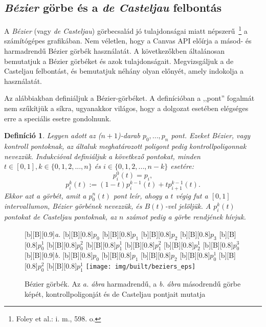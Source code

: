 \documentclass[12pt]{report}
\newtheorem{defi}[tét]{Definíció}
\theoremstyle{definition}
\begin{document}
    \subsection*{\emph{Bézier} görbe és a \emph{de Casteljau} felbontás}
    \label{sec:Bézier görbe és a de Casteljau felbontás}

A \emph{Bézier} (vagy \emph{de Casteljau}) görbecsalád jó tulajdonságai miatt
népszerű~\footnote{Foley et al.: i. m., 598. o.} a számítógépes grafikában. Nem
véletlen, hogy a Canvas API előírja a másod- és harmadrendű Bézier görbék
használatát. A következőkben általánosan bemutatjuk a Bézier görbéket és azok
tulajdonságait. Megvizsgáljuk a de Casteljau felbontást, és bemutatjuk néhány
olyan előnyét, amely indokolja a használatát.

Az alábbiakban definiáljuk a Bézier-görbéket. A definícióban a ,,pont'' fogalmát
nem szűkítjük a síkra, ugyanakkor világos, hogy a dolgozat esetében elégséges
erre a speciális esetre gondolnunk.

\begin{defi}\label{def:Bézier}\cite[Kurusa]{Kurusa:1999:szamitogepes} Legyen
adott az ($n+1$)-darab $p_0,...,p_n$ pont. Ezeket Bézier, vagy kontroll
pontoknak, az általuk meghatározott poligont pedig kontrollpoligonnak nevezzük.
Indukcióval definiáljuk a következő pontokat, minden $t \in [0,1], k \in
\{{0,1,2,...,n\}}$ és $i \in \{{0,1,2,...,n-k\}}$ esetére: \[p^0_i(t)=p_i,\]
\[p^k_i(t):=(1-t)p^{k-1}_i(t) + tp^{k-1}_{i+1}(t).\] Ekkor azt a görbét, amit a
$p^n_0(t)$ pont leír, ahogy a $t$ végig fut a $[0,1]$ intervallumon, Bézier
görbének nevezzük, és $B(t)$-vel jelöljük. A $p^k_i(t)$ pontokat de Casteljau
pontoknak, az $n$ számot pedig a görbe rendjének hívjuk. \end{defi}

  \begin{figure}
  [b][B][0.9]{\emph{a.}}
  [b][B][0.8]{\bf{$p_{0}$}}
  [b][B][0.8]{\bf{$p_{1}$}}
  [b][B][0.8]{\bf{$p_{2}$}}
  [b][B][0.8]{\bf{$p_{3}$}}
  [b][B][0.8]{\bf{$p_{0}^{1}$}}
  [b][B][0.8]{\bf{$p_{0}^{2}$}}
  [b][B][0.8]{\bf{$p_{1}^{1}$}}
  [b][B][0.8]{\bf{$p_{1}^{2}$}}
  [b][B][0.8]{\bf{$p_{2}^{1}$}}
  [b][B][0.8]{\bf{$p_{0}^{3}$}}
  [b][B][0.9]{\emph{b.}}
  [b][B][0.8]{\bf{$p_{0}$}}
  [b][B][0.8]{\bf{$p_{1}$}}
  [b][B][0.8]{\bf{$p_{2}$}}
  [b][B][0.8]{\bf{$p_{0}^{1}$}}
  [b][B][0.8]{\bf{$p_{0}^{2}$}}
  [b][B][0.8]{\bf{$p_{1}^{1}$}}
    \centering
    \texttt{[image: img/built/beziers\_eps]}
    \caption{\label{fig:beziers} Bézier görbék. Az \emph{a. ábra} harmadrendű, a
    \emph{b. ábra} másodrendű görbe képét, kontrollpoligonját és de
    Casteljau pontjait mutatja}
  \end{figure}
\end{document}
